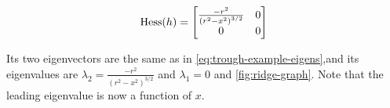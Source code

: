 \begin{equation}
\mathrm{Hess}(h) =
  \begin{bmatrix} \frac{-r^2}{\left(r^2 - x^2\right)^{3/2}} & 0 \\
                  0 & 0 \end{bmatrix}
\end{equation}

Its two eigenvectors are the same as in \cref{eq:trough-example-eigens},and its eigenvalues are $\lambda_2 = \frac{-r^2}{\left(r^2 - x^2\right)^{3/2}}$ and $\lambda_1 = 0$ and \cref{fig:ridge-graph}. Note that the leading eigenvalue is now a function of $x$.

%    
%  
%
